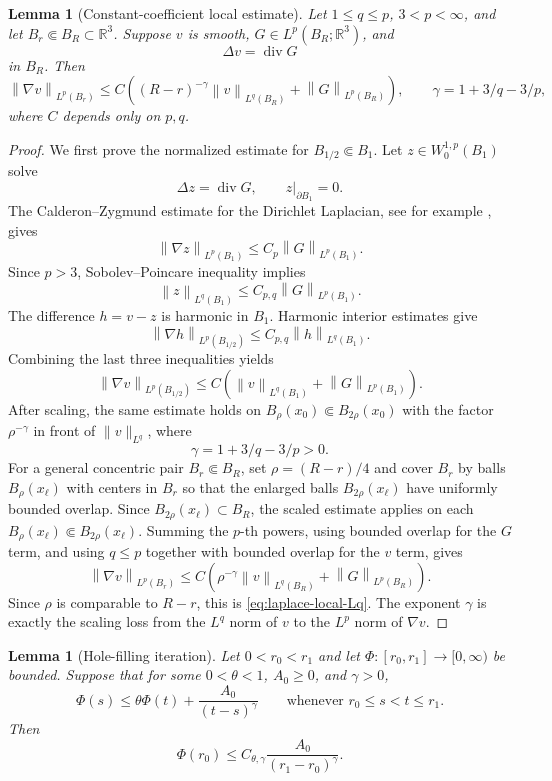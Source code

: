 \documentclass[11pt]{amsart}
\numberwithin{equation}{section}
\newtheorem{lemma}[theorem]{Lemma}
\theoremstyle{definition}
\newcommand{\R}{\mathbb R}
\newcommand{\divE}{\operatorname{div}}
\newcommand{\norm}[1]{\left\lVert #1\right\rVert}
\begin{document}
\begin{lemma}[Constant-coefficient local estimate]\label{lem:laplace-local-Lq}
Let $1\le q\le p$, $3<p<\infty$, and let $B_r\Subset B_R\subset\R^3$.  Suppose $v$ is smooth, $G\in L^p(B_R;\R^3)$, and
$$
        \Delta v=\divE G
$$
in $B_R$.  Then
\begin{equation}\label{eq:laplace-local-Lq}
        \norm{\nabla v}_{L^p(B_r)}
        \le C\left((R-r)^{-\gamma}\norm{v}_{L^q(B_R)}
        +\norm{G}_{L^p(B_R)}\right),
        \qquad
        \gamma=1+3/q-3/p,
\end{equation}
where $C$ depends only on $p,q$.
\end{lemma}

\begin{proof}
We first prove the normalized estimate for $B_{1/2}\Subset B_1$.  Let $z\in W^{1,p}_0(B_1)$ solve
$$
        \Delta z=\divE G,
        \qquad z|_{\partial B_1}=0.
$$
The Calderon--Zygmund estimate for the Dirichlet Laplacian, see for example \cite[Chapter~9]{GT}, gives
$$
        \norm{\nabla z}_{L^p(B_1)}\le C_p\norm{G}_{L^p(B_1)}.
$$
Since $p>3$, Sobolev--Poincare inequality implies
$$
        \norm{z}_{L^q(B_1)}\le C_{p,q}\norm{G}_{L^p(B_1)}.
$$
The difference $h=v-z$ is harmonic in $B_1$.  Harmonic interior estimates give
$$
        \norm{\nabla h}_{L^p(B_{1/2})}
        \le C_{p,q}\norm{h}_{L^q(B_1)}.
$$
Combining the last three inequalities yields
$$
        \norm{\nabla v}_{L^p(B_{1/2})}
        \le C\left(\norm{v}_{L^q(B_1)}+\norm{G}_{L^p(B_1)}\right).
$$
After scaling, the same estimate holds on $B_\rho(x_0)\Subset B_{2\rho}(x_0)$ with the factor $\rho^{-\gamma}$ in front of $\|v\|_{L^q}$, where
$$
        \gamma=1+3/q-3/p>0.
$$
For a general concentric pair $B_r\Subset B_R$, set $\rho=(R-r)/4$ and cover $B_r$ by balls $B_\rho(x_\ell)$ with centers in $B_r$ so that the enlarged balls $B_{2\rho}(x_\ell)$ have uniformly bounded overlap.  Since $B_{2\rho}(x_\ell)\subset B_R$, the scaled estimate applies on each $B_\rho(x_\ell)\Subset B_{2\rho}(x_\ell)$.  Summing the $p$-th powers, using bounded overlap for the $G$ term, and using $q\le p$ together with bounded overlap for the $v$ term, gives
$$
        \norm{\nabla v}_{L^p(B_r)}
        \le C\left(\rho^{-\gamma}\norm{v}_{L^q(B_R)}+\norm{G}_{L^p(B_R)}\right).
$$
Since $\rho$ is comparable to $R-r$, this is \eqref{eq:laplace-local-Lq}.  The exponent $\gamma$ is exactly the scaling loss from the $L^q$ norm of $v$ to the $L^p$ norm of $\nabla v$.
\end{proof}

\begin{lemma}[Hole-filling iteration]\label{lem:hole-filling}
Let $0<r_0<r_1$ and let $\Phi:[r_0,r_1]\to[0,\infty)$ be bounded.  Suppose that for some $0<\theta<1$, $A_0\ge0$, and $\gamma>0$,
\begin{equation}\label{eq:hole-filling-assumption}
        \Phi(s)\le \theta\Phi(t)+\frac{A_0}{(t-s)^\gamma}
        \qquad\text{whenever }r_0\le s<t\le r_1.
\end{equation}
Then
\begin{equation}\label{eq:hole-filling-conclusion}
        \Phi(r_0)\le C_{\theta,\gamma}\frac{A_0}{(r_1-r_0)^\gamma}.
\end{equation}
\end{lemma}
\end{document}
